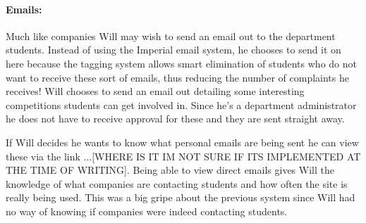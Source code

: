   \paragraph{Emails:}
    Much like companies Will may wish to send an email out to the department students. Instead of using the Imperial email system, he chooses to send it on here because the tagging system allows smart elimination of students who do not want to receive these sort of emails, thus reducing the number of complaints he receives! Will chooses to send an email out detailing some interesting competitions students can get involved in. Since he's a department administrator he does not have to receive approval for these and they are sent straight away.

    If Will decides he wants to know what personal emails are being sent he can view these via the link ...[WHERE IS IT IM NOT SURE IF ITS IMPLEMENTED AT THE TIME OF WRITING]. Being able to view direct emails gives Will the knowledge of what companies are contacting students and how often the site is really being used. This was a big gripe about the previous system since Will had no way of knowing if companies were indeed contacting students.
